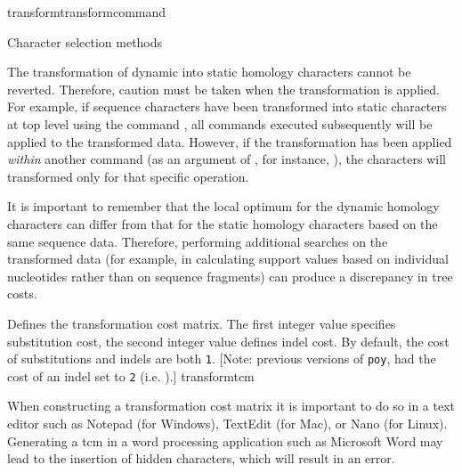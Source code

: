 \begin{command}{transform}{transformcommand}
\begin{arguments}
\begin{argumentgroup}{Character selection methods}
      \begin{statement}
  	  The transformation of dynamic into static homology characters cannot be reverted.
	  Therefore, caution must be taken when the transformation is applied. For example,
	  if sequence characters have been transformed into static characters at top level using
	  the command , all commands executed 
	  subsequently will be applied to the transformed data. However, if the transformation has 
	  been applied \emph{within} another command (as an argument of , 
	  for instance, ), the characters will 
	  transformed only for that specific operation.
	   \end{statement}
	   
                  

	\begin{statement}
  	  It is important to remember that the local optimum for the dynamic homology
	  characters can differ from that for the static homology characters based on the
	  same sequence data. Therefore, performing additional searches on the transformed
	  data (for example, in calculating support values based on individual nucleotides
	  rather than on sequence fragments) can produce a discrepancy in tree costs.
	\end{statement}

            {Defines the transformation cost matrix. The first integer value specifies
            substitution cost, the second integer value defines indel cost. By default,
            the cost of substitutions and indels are both \texttt{1}.  
            [Note: previous versions of \texttt{poy}, had the cost of an indel set to 
            \texttt{2} (i.e. ).]}
            {transformtcm}
            
            	\begin{statement}
  	  When constructing a transformation cost matrix it is important to do so in a text editor 
	  such as Notepad (for Windows), TextEdit (for Mac), or Nano (for Linux). Generating a tcm in 
	  a word processing application such as Microsoft Word may lead to the insertion of hidden 
	  characters, which will result in an error.
	\end{statement}


\end{argumentgroup}
\end{arguments}
\end{command}
